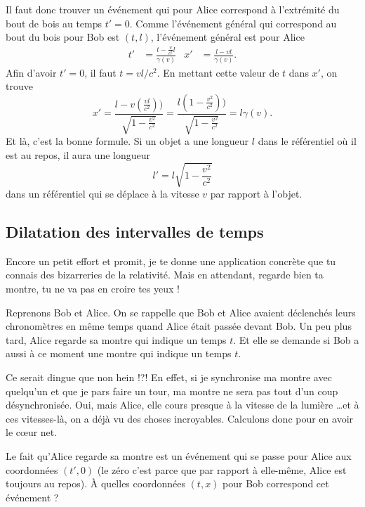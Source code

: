 Il faut donc trouver un événement qui pour Alice correspond à l'extrémité du bout de bois au temps \( t'=0\). Comme l'événement général qui correspond au bout du bois pour Bob est \( (t,l)\), l'événement général est pour Alice
\begin{align}
	t' & =\frac{ t-\frac{ v }{ c^2 }l }{ \gamma(v) }
	   & x'                                          & =\frac{ l-vt }{ \gamma(v) }.
\end{align}
Afin d'avoir \( t'=0\), il faut \( t=vl/c^2\). En mettant cette valeur de \( t\) dans \( x'\), on trouve
\[
	x'=\frac{ l-v\left( \frac{ vl }{ c^2 } \right)) }{ \sqrt{1-\frac{ v^2 }{ c^2 }} }=\frac{ l\left( 1-\frac{ v^2 }{ c^2 } \right)) }{ \sqrt{1-\frac{ v^2 }{ c^2 }} }=l\gamma(v).
\]
Et là, c'est la bonne formule. Si un objet a une longueur \( l\) dans le référentiel où il est au repos, il aura une longueur
\begin{equation}
	l'=l\sqrt{1-\frac{ v^2 }{ c^2 }}
\end{equation}
dans un référentiel qui se déplace à la vitesse \( v\) par rapport à l'objet.


\subsection{Dilatation des intervalles de temps}

Encore un petit effort et promit, je te donne une application concrète que tu connais des bizarreries de la relativité. Mais en attendant, regarde bien ta montre, tu ne va pas en croire tes yeux !

Reprenons Bob et Alice. On se rappelle que Bob et Alice avaient déclenchés leurs chronomètres en même temps quand Alice était passée devant Bob. Un peu plus tard, Alice regarde sa montre qui indique un temps \( t\). Et elle se demande si Bob a aussi à ce moment une montre qui indique un temps \( t\).

Ce serait dingue que non hein !?! En effet, si je synchronise ma montre avec quelqu'un et que je pars faire un tour, ma montre ne sera pas tout d'un coup  désynchronisée. Oui, mais Alice, elle cours presque à la vitesse de la lumière \ldots et à ces vitesses-là, on a déjà vu des choses incroyables. Calculons donc pour en avoir le c\oe ur net.

Le fait qu'Alice regarde sa montre est un événement qui se passe pour Alice aux coordonnées \( (t',0)\) (le zéro c'est parce que par rapport à elle-même, Alice est toujours au repos). À quelles coordonnées \( (t,x)\) pour Bob correspond cet événement ?

